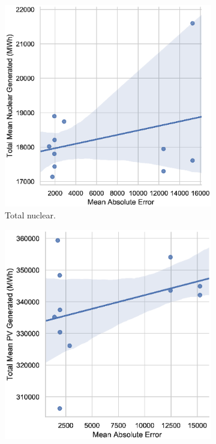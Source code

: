 \documentclass[final,3p,times,twocolumn,numbers]{elsarticle}
\begin{document}
\begin{figure}
\begin{subfigure}[b]{0.475\textwidth}
\includegraphics[width=\columnwidth]{figures/results/elecsim_results/total_Nuclear_mean_output.eps}
\caption{Total nuclear.}
\label{fig:total_Onshore_mean_output}
\end{subfigure}
\hfill
\begin{subfigure}[b]{0.475\textwidth}  
\centering
\includegraphics[width=\columnwidth]{figures/results/elecsim_results/total_PV_mean_output.eps}

\end{subfigure}
\end{figure}
\end{document}
